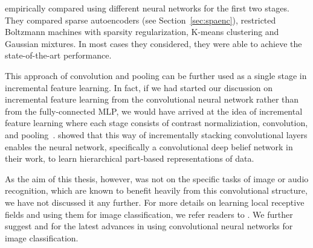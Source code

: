 \documentclass{now}
\begin{document}
\citet{Coates2011} empirically compared using different neural networks for the
first two stages. They compared sparse autoencoders (see
Section~\ref{sec:spaenc}), restricted Boltzmann machines with sparsity
regularization, K-means clustering and Gaussian mixtures. In most cases they
considered, they were able to achieve the state-of-the-art performance.

This approach of convolution and pooling can be further used as a single stage
in incremental feature learning.  In fact, if we had started our discussion on
incremental feature learning from the convolutional neural network \citep[see,
e.g.,][]{Lecun1998} rather than from the fully-connected MLP, we would have
arrived at the idea of incremental feature learning where each stage consists of
contrast normaliziation, convolution, and pooling~\citep[see,
e.g.,][]{Lecun2010}. \citet{Lee2009} showed that this way of incrementally
stacking convolutional layers enables the neural network, specifically a
convolutional deep belief network in their work, to learn hierarchical
part-based representations of data.

As the aim of this thesis, however, was not on the specific tasks of image or
audio recognition, which are known to benefit heavily from this convolutional
structure, we have not discussed it any further. For more details on learning
local receptive fields and using them for image classification, we refer readers
to \citep{Coates2012t}. We further suggest \citep{Krizhevsky2012} and
\citep{Ciresan2012b} for the latest advances in using convolutional neural
networks for image classification.


%

\backmatter


\end{document}
